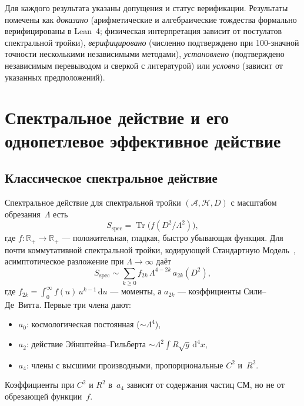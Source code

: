 \documentclass[12pt,a4paper]{article}
\theoremstyle{plain}
\theoremstyle{definition}
\theoremstyle{remark}
\newcommand{\dd}{\mathrm{d}}
\newcommand{\Tr}{\operatorname{Tr}}
\begin{document}
Для каждого результата указаны допущения и статус верификации.
Результаты помечены как \emph{доказано} (арифметические и
алгебраические тождества формально верифицированы в Lean~4;
физическая интерпретация зависит от постулатов спектральной тройки),
\emph{верифицировано} (численно подтверждено при 100-значной точности
несколькими независимыми методами), \emph{установлено} (подтверждено
независимым перевыводом и сверкой с литературой) или \emph{условно}
(зависит от указанных предположений).

\section{Спектральное действие и его однопетлевое эффективное действие}
\label{sec:action}

\subsection{Классическое спектральное действие}
\label{sec:classical}

Спектральное действие для спектральной тройки $(\mathcal{A},
\mathcal{H}, D)$ с масштабом обрезания~$\Lambda$
есть~\cite{CC:1996,CC:1997}
\begin{equation}\label{eq:spec-action}
  S_{\mathrm{spec}} = \Tr\bigl(f(D^2/\Lambda^2)\bigr),
\end{equation}
где $f \colon \mathbb{R}_+ \to \mathbb{R}_+$ --- положительная,
гладкая, быстро убывающая функция. Для почти коммутативной
спектральной тройки, кодирующей Стандартную
Модель~\cite{CCM:2006}, асимптотическое разложение при
$\Lambda \to \infty$ даёт~\cite{Vassilevich:2003}
\begin{equation}\label{eq:heat-expansion}
  S_{\mathrm{spec}} \sim \sum_{k \geq 0}
  f_{2k}\, \Lambda^{4-2k}\, a_{2k}(D^2),
\end{equation}
где $f_{2k} = \int_0^\infty f(u)\, u^{k-1}\, \dd u$ --- моменты,
а $a_{2k}$ --- коэффициенты Сили--Де~Витта. Первые три члена дают:
\begin{itemize}
  \item $a_0$: космологическая постоянная ($\sim \Lambda^4$),
  \item $a_2$: действие Эйнштейна--Гильберта
    $\sim \Lambda^2 \int R \sqrt{g}\, \dd^4 x$,
  \item $a_4$: члены с высшими производными, пропорциональные
    $C^2$ и~$R^2$.
\end{itemize}
Коэффициенты при $C^2$ и $R^2$ в~$a_4$ зависят от содержания частиц
СМ, но не от обрезающей функции~$f$.
\end{document}
